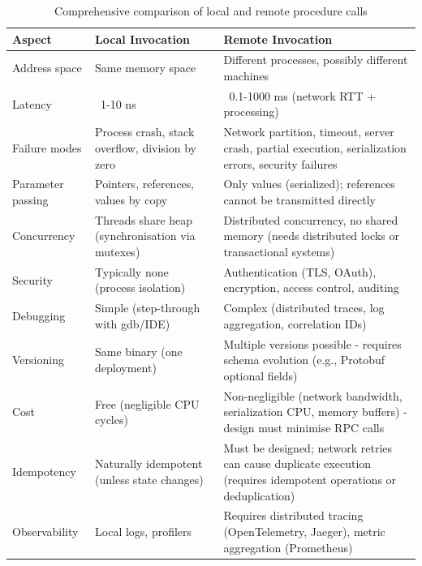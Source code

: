 \documentclass[10pt,a4paper]{article}
\begin{document}
\begin{longtable}{|p{4cm}|p{5cm}|p{5cm}|}
\caption{Comprehensive comparison of local and remote procedure calls} \label{tab:local_remote} \\
\hline
\textbf{Aspect} & \textbf{Local Invocation} & \textbf{Remote Invocation} \\
\hline
Address space & Same memory space & Different processes, possibly different machines \\
Latency & ~1-10 ns & ~0.1-1000 ms (network RTT + processing) \\
Failure modes & Process crash, stack overflow, division by zero & Network partition, timeout, server crash, partial execution, serialization errors, security failures \\
Parameter passing & Pointers, references, values by copy & Only values (serialized); references cannot be transmitted directly \\
Concurrency & Threads share heap (synchronisation via mutexes) & Distributed concurrency, no shared memory (needs distributed locks or transactional systems) \\
Security & Typically none (process isolation) & Authentication (TLS, OAuth), encryption, access control, auditing \\
Debugging & Simple (step-through with gdb/IDE) & Complex (distributed traces, log aggregation, correlation IDs) \\
Versioning & Same binary (one deployment) & Multiple versions possible - requires schema evolution (e.g., Protobuf optional fields) \\
Cost & Free (negligible CPU cycles) & Non-negligible (network bandwidth, serialization CPU, memory buffers) - design must minimise RPC calls \\
Idempotency & Naturally idempotent (unless state changes) & Must be designed; network retries can cause duplicate execution (requires idempotent operations or deduplication) \\
Observability & Local logs, profilers & Requires distributed tracing (OpenTelemetry, Jaeger), metric aggregation (Prometheus) \\
\hline
\end{longtable}
\end{document}
